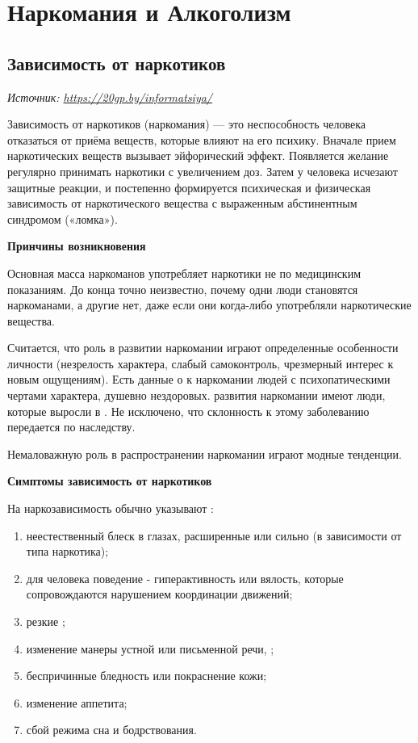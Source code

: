 \chapter{Наркомания и Алкоголизм}

\section{Зависимость от наркотиков}

 {\it Источник: \url{https://20gp.by/informatsiya/}}

Зависимость от наркотиков (наркомания) --- это неспособность человека отказаться от приёма веществ, которые влияют на его психику. Вначале прием наркотических веществ вызывает эйфорический эффект. Появляется желание регулярно принимать наркотики с увеличением доз. Затем у человека исчезают защитные реакции, и постепенно формируется психическая и физическая зависимость от наркотического вещества с выраженным абстинентным синдромом («ломка»).

\textbf{Принчины возникновения}

Основная масса наркоманов употребляет наркотики не по медицинским показаниям. До конца точно неизвестно, почему одни люди становятся наркоманами, а другие нет, даже если они когда-либо употребляли наркотические вещества.

Считается, что роль в развитии наркомании играют определенные особенности личности (незрелость характера, слабый самоконтроль, чрезмерный интерес к новым ощущениям). Есть данные о  к наркомании людей с психопатическими чертами характера, душевно нездоровых.  развития наркомании имеют люди, которые выросли в . Не исключено, что склонность к этому заболеванию передается по наследству.

Немаловажную роль в распространении наркомании играют модные тенденции.

\textbf{Симптомы зависимость от наркотиков}

На наркозависимость обычно указывают :
\begin{enumerate}
    \item неестественный блеск в глазах, расширенные или сильно  (в зависимости от типа наркотика);
    \item {} для человека поведение  - гиперактивность или вялость, которые сопровождаются нарушением координации движений;
    \item резкие ;
    \item изменение манеры устной или письменной речи, ;
    \item беспричинные бледность или покраснение кожи;
    \item изменение аппетита;
    \item сбой режима сна и бодрствования.
\end{enumerate}

